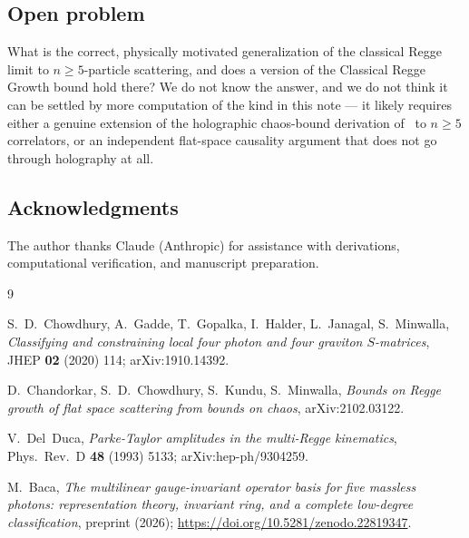\documentclass[reqno]{amsart}
\begin{document}
\subsection*{Open problem} What is the correct, physically motivated generalization of the
classical Regge limit to $n\geq5$-particle scattering, and does a version of the Classical Regge
Growth bound hold there? We do not know the answer, and we do not think it can be settled by more
computation of the kind in this note --- it likely requires either a genuine extension of the
holographic chaos-bound derivation of~\cite{chaosbound2021} to $n\geq5$ correlators, or an
independent flat-space causality argument that does not go through holography at all.

\subsection*{Acknowledgments}
The author thanks Claude (Anthropic) for assistance with derivations, computational verification,
and manuscript preparation.

\begin{thebibliography}{9}

S.~D.~Chowdhury, A.~Gadde, T.~Gopalka, I.~Halder, L.~Janagal, S.~Minwalla, \emph{Classifying and
constraining local four photon and four graviton $S$-matrices}, JHEP \textbf{02} (2020) 114;
arXiv:1910.14392.

D.~Chandorkar, S.~D.~Chowdhury, S.~Kundu, S.~Minwalla, \emph{Bounds on Regge growth of flat space
scattering from bounds on chaos}, arXiv:2102.03122.

V.~Del~Duca, \emph{Parke-Taylor amplitudes in the multi-Regge kinematics}, Phys.\ Rev.\ D
\textbf{48} (1993) 5133; arXiv:hep-ph/9304259.

M.~Baca, \emph{The multilinear gauge-invariant operator basis for five massless photons:
representation theory, invariant ring, and a complete low-degree classification}, preprint (2026);
\url{https://doi.org/10.5281/zenodo.22819347}.

\end{thebibliography}
\end{document}
